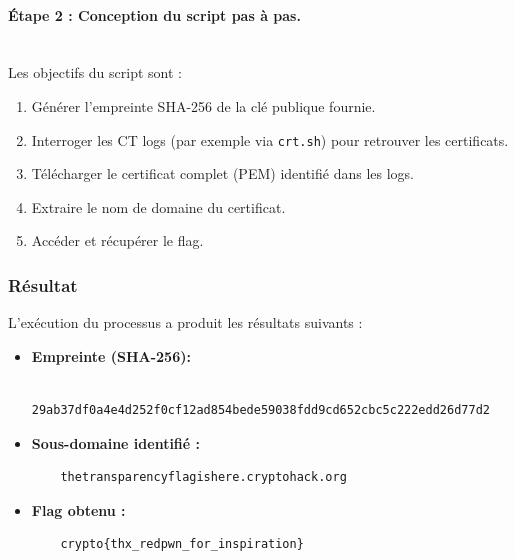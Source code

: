 \paragraph{\textbf{Étape 2 : Conception du script pas à pas.}}~\\
Les objectifs du script sont :
\begin{enumerate}
    \item Générer l'empreinte SHA-256 de la clé publique fournie.
    \item Interroger les CT logs (par exemple via \texttt{crt.sh}) pour
            retrouver les certificats.
    \item Télécharger le certificat complet (PEM) identifié dans les logs.
    \item Extraire le nom de domaine du certificat.
    \item Accéder et récupérer le flag.
\end{enumerate}

\subsubsection{Résultat}
L'exécution du processus a produit les résultats suivants :
\begin{itemize}
    \item \textbf{Empreinte (SHA-256):}
    \begin{verbatim}
    29ab37df0a4e4d252f0cf12ad854bede59038fdd9cd652cbc5c222edd26d77d2
    \end{verbatim}
    \item \textbf{Sous-domaine identifié :}
    \begin{verbatim}
    thetransparencyflagishere.cryptohack.org
    \end{verbatim}
    \item \textbf{Flag obtenu :}
    \begin{verbatim}
    crypto{thx_redpwn_for_inspiration}
    \end{verbatim}
\end{itemize}